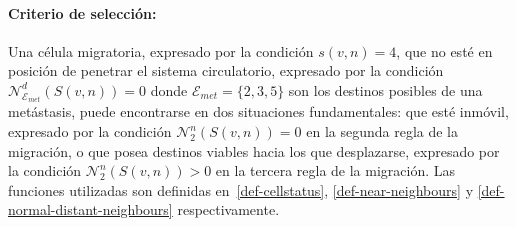 \paragraph*{{Criterio de selecci\'on}:} Una c\'elula migratoria, expresado por la condici\'on $s(v,n)=4$, que no est\'e en posici\'on de penetrar el sistema circulatorio, expresado por la condici\'on $\mathcal{N}_{\mathcal{E}_{met}}^d(S(v,n))=0$ donde $\mathcal{E}_{met}=\lbrace 2,3,5 \rbrace$ son los destinos posibles de una met\'astasis, puede encontrarse en dos situaciones fundamentales: que est\'e inm\'ovil, expresado por la condici\'on $\mathcal{N}_2^n(S(v,n))=0$ en la segunda regla de la migraci\'on, o que posea destinos viables hacia los que desplazarse, expresado por la condici\'on $\mathcal{N}_2^n(S(v,n))>0$ en la tercera regla de la migraci\'on. Las funciones utilizadas son definidas en~\ref{def-cellstatus}, \ref{def-near-neighbours} y \ref{def-normal-distant-neighbours} respectivamente.

